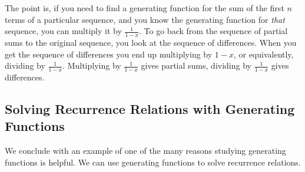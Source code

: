 \documentclass[10pt,]{book}
\theoremstyle{plain}
\theoremstyle{definition}
\theoremstyle{definition}
\theoremstyle{definition}
\theoremstyle{definition}
\numberwithin{equation}{chapter}
\begin{document}
\par
\hypertarget{p-1106}{}%
The point is, if you need to find a generating function for the sum of the first \(n\) terms of a particular sequence, and you know the generating function for \emph{that} sequence, you can multiply it by  \(\frac{1}{1-x}\). To go back from the sequence of partial sums to the original sequence, you look at the sequence of differences. When you get the sequence of differences you end up multiplying by \(1-x\), or equivalently, dividing by \(\frac{1}{1-x}\). Multiplying by \(\frac{1}{1-x}\) gives partial sums, dividing by \(\frac{1}{1-x}\) gives differences.%
\typeout{************************************************}
\typeout{************************************************}
\subsection[{Solving Recurrence Relations with Generating Functions}]{Solving Recurrence Relations with Generating Functions}\label{subsection-27}
\hypertarget{p-1107}{}%
We conclude with an example of one of the many reasons studying generating functions is helpful. We can use generating functions to solve recurrence relations.%
\end{document}
